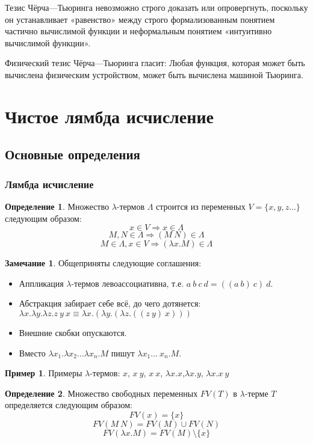 \documentclass[10pt,twoside]{article}
\theoremstyle{plain}
\theoremstyle{definition}
\newtheorem{defi}{Определение}
\newtheorem*{remark}{Замечание}
\newtheorem*{example}{Пример}
\begin{document}
Тезис Чёрча—Тьюринга невозможно строго доказать или опровергнуть, поскольку он устанавливает «равенство» между строго формализованным понятием частично вычислимой функции и неформальным понятием «интуитивно вычислимой функции».

Физический тезис Чёрча—Тьюринга гласит: Любая функция, которая может быть вычислена физическим устройством, может быть вычислена машиной Тьюринга.

\section{Чистое лямбда исчисление}
\subsection{Основные определения}
\subsubsection{Лямбда исчисление}
\begin{defi}
  Множество $\lambda$-термов $\Lambda$ строится из переменных $V=\{x,y,z\ldots\}$ следующим образом:
  $$x\in V \Rightarrow x\in \Lambda$$
  $$M, N \in \Lambda \Rightarrow (M\ N)\in \Lambda$$
  $$M\in \Lambda,x\in V\Rightarrow (\lambda x.M)\in\Lambda$$
\end{defi}

\begin{remark}
  Общеприняты следующие соглашения:
  \begin{itemize}
    \item Аппликация $\lambda$-термов левоассоциативна, т.е. $a\ b\ c\ d = ((a\ b)\ c)\ d$.
    \item Абстракция забирает себе всё, до чего дотянется: $\lambda x.\lambda y.\lambda z.z\ y\ x \equiv \lambda x.(\lambda y.(\lambda z.((z\ y)\ x)))$
    \item Внешние скобки опускаются.
    \item Вместо $\lambda x_1.\lambda x_2 \ldots \lambda x_n.M$ пишут $\lambda x_1\ldots\ x_n.M$.
  \end{itemize}
\end{remark}

\begin{example} Примеры $\lambda$-термов:
  $x$, $x\ y$, $x\ x$, $\lambda x.x$,$\lambda x.y$, $\lambda x.x\ y$
\end{example}

\begin{defi}
  Множество свободных переменных $FV(T)$ в $\lambda$-терме $T$ определяется следующим образом:
  $$FV(x)=\{x\}$$
  $$FV(M\ N)=FV(M)\cup FV(N)$$
  $$FV(\lambda x.M) = FV(M)\setminus \{x\}$$
\end{defi}
\end{document}

